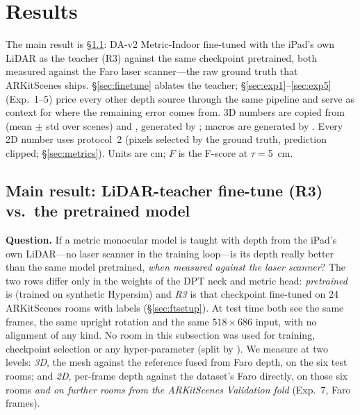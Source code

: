 \section{Results}\label{sec:results}
The main result is \S\ref{sec:main}: DA-v2 Metric-Indoor fine-tuned with the iPad's own LiDAR as the teacher (R3)
against the same checkpoint pretrained, both measured against the Faro laser scanner---the raw ground truth that
ARKitScenes ships. \S\ref{sec:finetune} ablates the teacher; \S\ref{sec:exp1}--\ref{sec:exp5} (Exp.~1--5) price
every other depth source through the same pipeline and serve as context for where the remaining error comes from.
3D numbers are copied from  (mean $\pm$ std over scenes) and
, generated by ; macros are generated by .
Every 2D number uses protocol~2 (pixels selected by the ground truth, prediction clipped; \S\ref{sec:metrics}).
Units are cm; $F$ is the F-score at $\tau=$\SI{5}{cm}.

\subsection{Main result: LiDAR-teacher fine-tune (R3) vs.\ the pretrained model}\label{sec:main}
\textbf{Question.} If a metric monocular model is taught with depth from the iPad's own LiDAR---no laser scanner in
the training loop---is its depth really better than the same model pretrained, \emph{when measured against the laser
scanner}? The two rows differ only in the weights of the DPT neck and metric head: \emph{pretrained} is
 (trained on synthetic Hypersim) and \emph{R3} is that checkpoint
fine-tuned on 24 ARKitScenes rooms with  labels (\S\ref{sec:ftsetup}). At test time both see the
same  frames, the same upright rotation and the same $518\times686$ input, with no alignment of any kind.
No room in this subsection was used for training, checkpoint selection or any hyper-parameter (split by
). We measure at two levels: \emph{3D}, the mesh against the reference fused from Faro depth, on the six
test rooms; and \emph{2D}, per-frame depth against the dataset's Faro  directly, on those six rooms
\emph{and on \rsVN{} further rooms from the ARKitScenes Validation fold} (Exp.~7, \rsVFRAMES{} Faro frames).

